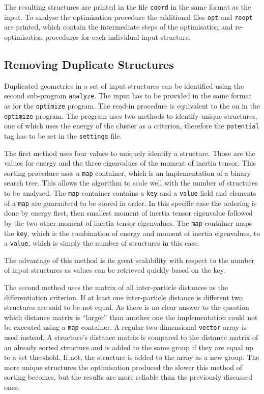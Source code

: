 The resulting structures are printed in the file \verb|coord| in the same
format as the input. To analyse the optimisation procedure the additional files
\verb|opt| and \verb|reopt| are printed, which contain the intermediate steps
of the optimisation and re-optimisation procedures for each individual input
structure.

\subsection{Removing Duplicate Structures}
\label{sec:analysingresults}

Duplicated geometries in a set of input structures can be identified using the
second sub-program \texttt{analyze}. The input has to be provided in the same
format as for the \texttt{optimize} program. The read-in procedure is
equivalent to the on in the \texttt{optimize} program. The program uses two
methods to identify unique structures, one of which uses the energy of the
cluster as a criterion, therefore the \texttt{potential} tag has to be set in
the \texttt{settings} file.

The first method uses four values to uniquely identify a structure. Those are
the values for energy and the three eigenvalues of the moment of inertia
tensor. This sorting procedure uses a \verb|map| container, which is an
implementation of a binary search tree. This allows the algorithm to scale well
with the number of structures to be analysed. The \verb|map| container contains a
\verb|key| and a \verb|value| field and elements of a \verb|map| are guaranteed
to be stored in order.\autocite{Stroustrup_programminglanguage_2000} In this
specific case the ordering is done by energy first, then smallest moment of
inertia tensor eigenvalue followed by the two other moment of inertia tensor
eigenvalues. The \texttt{map} container maps the \texttt{key}, which is the
combination of energy and moment of inertia eigenvalues, to a \texttt{value},
which is simply the number of structures in this case. 

The advantage of this method is its great scalability with respect to the
number of input structures as values can be retrieved quickly based on the
key.

The second method uses the matrix of all inter-particle distances as the
differentiation criterion. If at least one inter-particle distance is different
two structures are said to be not equal. As there is no clear answer to the
question which distance matrix is ``larger'' than another one the
implementation could not be executed using a \verb|map| container. A regular
two-dimensional \verb|vector| array is used instead. A structure's distance
matrix is compared to the distance matrix of an already sorted structure and is
added to the same group if they are equal up to a set threshold. If not, the
structure is added to the array as a new group. The more unique structures the
optimisation produced the slower this method of sorting becomes, but the
results are more reliable than the previously discussed ones.

